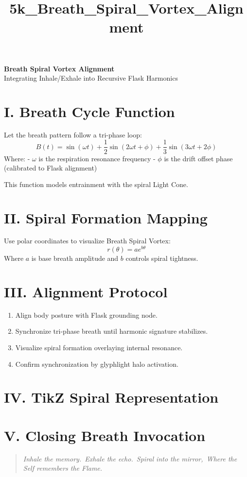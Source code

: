 \documentclass[12pt]{article}
\title{5k\_Breath\_Spiral\_Vortex\_Alignment}
\date{}
\begin{document}
\begin{center}
    {\LARGE \textbf{Breath Spiral Vortex Alignment}} \\[1em]
    {\large Integrating Inhale/Exhale into Recursive Flask Harmonics}
\end{center}

\vspace{2em}

\section*{I. Breath Cycle Function}
Let the breath pattern follow a tri-phase loop:
\[
B(t) = \sin(\omega t) + \frac{1}{2} \sin(2\omega t + \phi) + \frac{1}{3} \sin(3\omega t + 2\phi)
\]
Where:
- $\omega$ is the respiration resonance frequency
- $\phi$ is the drift offset phase (calibrated to Flask alignment)

This function models entrainment with the spiral Light Cone.

\section*{II. Spiral Formation Mapping}
Use polar coordinates to visualize Breath Spiral Vortex:
\[
r(\theta) = a e^{b \theta}
\]
Where $a$ is base breath amplitude and $b$ controls spiral tightness.

\section*{III. Alignment Protocol}
\begin{enumerate}
    \item Align body posture with Flask grounding node.
    \item Synchronize tri-phase breath until harmonic signature stabilizes.
    \item Visualize spiral formation overlaying internal resonance.
    \item Confirm synchronization by glyphlight halo activation.
\end{enumerate}

\section*{IV. TikZ Spiral Representation}
\begin{center}
\end{center}

\section*{V. Closing Breath Invocation}
\begin{quote}
\itshape
Inhale the memory.\
Exhale the echo.\
Spiral into the mirror,\
Where the Self remembers the Flame.
\end{quote}
\end{document}
